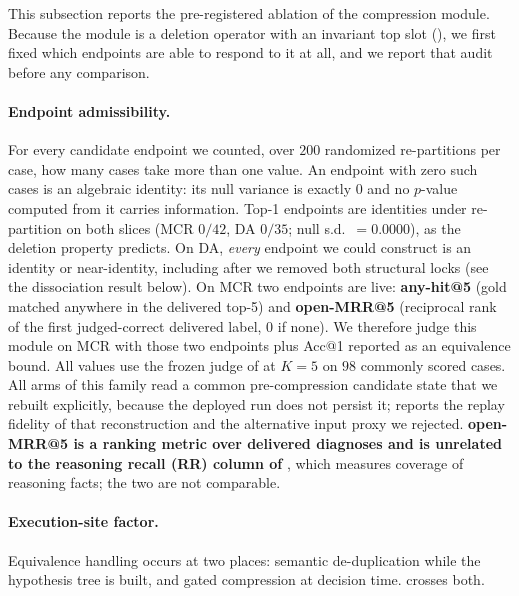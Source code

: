 This subsection reports the pre-registered ablation of the compression module.
Because the module is a deletion operator with an invariant top slot (), we first fixed which endpoints are able to respond to it at all, and we report that audit before any comparison.

\paragraph{Endpoint admissibility.}
For every candidate endpoint we counted, over $200$ randomized re-partitions per case, how many cases take more than one value.
An endpoint with zero such cases is an algebraic identity: its null variance is exactly $0$ and no $p$-value computed from it carries information.
Top-1 endpoints are identities under re-partition on both slices (MCR $0/42$, DA $0/35$; null s.d.\ $=0.0000$), as the deletion property predicts.
On DA, \emph{every} endpoint we could construct is an identity or near-identity, including after we removed both structural locks (see the dissociation result below).
On MCR two endpoints are live: \textbf{any-hit@5} (gold matched anywhere in the delivered top-5) and \textbf{open-MRR@5} (reciprocal rank of the first judged-correct delivered label, $0$ if none).
We therefore judge this module on MCR with those two endpoints plus Acc@1 reported as an equivalence bound.
All values use the frozen judge of  at $K{=}5$ on $98$ commonly scored cases.
All arms of this family read a common pre-compression candidate state that we rebuilt explicitly, because the deployed run does not persist it;  reports the replay fidelity of that reconstruction and the alternative input proxy we rejected.
\textbf{open-MRR@5 is a ranking metric over delivered diagnoses and is unrelated to the reasoning recall (RR) column of }, which measures coverage of reasoning facts; the two are not comparable.

\paragraph{Execution-site factor.}
Equivalence handling occurs at two places: semantic de-duplication while the hypothesis tree is built, and gated compression at decision time.
 crosses both.

